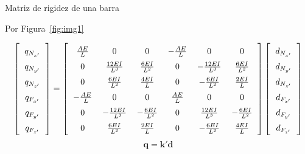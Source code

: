 \documentclass{beamer}
\begin{document}
\begin{frame}{Matriz de rigidez de una barra}

  Por Figura~\ref{fig:img1}


    \[
        \setlength{\arraycolsep}{6pt}
        \renewcommand{\arraystretch}{1.5}
        \left[
        \begin{array}{c}
        q_{N_{x'}} \\
        q_{N_{y'}} \\
        q_{N_{z'}} \\
        q_{F_{x'}} \\
        q_{F_{y'}} \\
        q_{F_{z'}}
        \end{array}
        \right]
        =
        \left[
        \begin{array}{cccccc}
        \frac{AE}{L} & 0 & 0 & -\frac{AE}{L} & 0 & 0 \\
        0 & \frac{12EI}{L^3} & \frac{6EI}{L^2} & 0 & -\frac{12EI}{L^3} & \frac{6EI}{L^2} \\
        0 & \frac{6EI}{L^2} & \frac{4EI}{L} & 0 & -\frac{6EI}{L^2} & \frac{2EI}{L} \\
        -\frac{AE}{L} & 0 & 0 & \frac{AE}{L} & 0 & 0 \\
        0 & -\frac{12EI}{L^3} & -\frac{6EI}{L^2} & 0 & \frac{12EI}{L^3} & -\frac{6EI}{L^2} \\
        0 & \frac{6EI}{L^2} & \frac{2EI}{L} & 0 & -\frac{6EI}{L^2} & \frac{4EI}{L}
        \end{array}
        \right]
        \left[
        \begin{array}{c}
        d_{N_{x'}} \\
        d_{N_{y'}} \\
        d_{N_{z'}} \\
        d_{F_{x'}} \\
        d_{F_{y'}} \\
        d_{F_{z'}}
        \end{array}
        \right]
        \]
    \begin{equation*}
        \mathbf{q} = \mathbf{k'} \mathbf{d}
    \end{equation*}

\end{frame}
\end{document}
